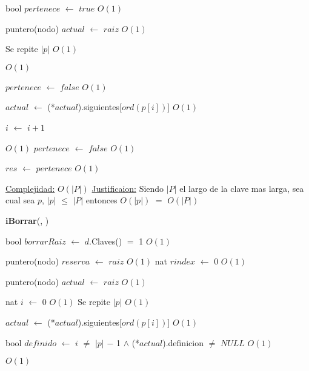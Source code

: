 \begin{Algoritmos}
\begin{algorithm}[H]
\begin{algorithmic}[1]
\State bool $pertenece$ $\gets$ $true$ \Comment $O(1)$

\State puntero(nodo) $actual$ $\gets$ $raiz$ \Comment $O(1)$ 

   \Comment Se repite $|p|$ $O(1)$
		
	
	 \Comment $O(1)$

		\State $pertenece$ $\gets$ $false$ \Comment $O(1)$	 
	
	\EndIf
	
	\State $actual$ $\gets$ (*$actual$).siguientes[$ord(p[i])$] \Comment $O(1)$

	\State $i$ $\gets$ $i + 1$
\EndWhile 

 \Comment $O(1)$ 
	\State $pertenece$ $\gets$ $false$ \Comment $O(1)$
\EndIf

\State $res$ $\gets$ $pertenece$ \Comment $O(1)$ 

\medskip
\State \underline{Complejidad:} $O(|P|)$
\State \underline{Justificaion:} Siendo $|P|$ el largo de la clave mas larga, sea cual sea $p$, $|p|$ $\leq$ $|P|$ entonces 	$O(|p|)$ $=$ $O(|P|)$

\end{algorithmic}
\end{algorithm}



\begin{algorithm}[H]
{\textbf{iBorrar}(, })
\begin{algorithmic}[1]

\State bool $borrarRaiz$ $\gets$ $d$.Claves() $=$ 1 \Comment $O(1)$

\State puntero(nodo) $reserva$ $\gets$ $raiz$ \Comment $O(1)$ 
\State nat $rindex$ $\gets$ 0 \Comment $O(1)$

\State puntero(nodo) $actual$ $\gets$ $raiz$ \Comment $O(1)$ 

\State nat $i$ $\gets$ 0 \Comment $O(1)$
   \Comment Se repite $|p|$ $O(1)$
		
	
	
	\State $actual$ $\gets$ (*$actual$).siguientes[$ord(p[i])$] \Comment $O(1)$

	\State bool $definido$ $\gets$ $i$ $\neq$ $|p|$ $-$ 1 $\land$ (*$actual$).definicion $\neq$ $NULL$ \Comment $O(1)$

	 \Comment $O(1)$


\end{algorithmic}
\end{algorithm}
\end{Algoritmos}
